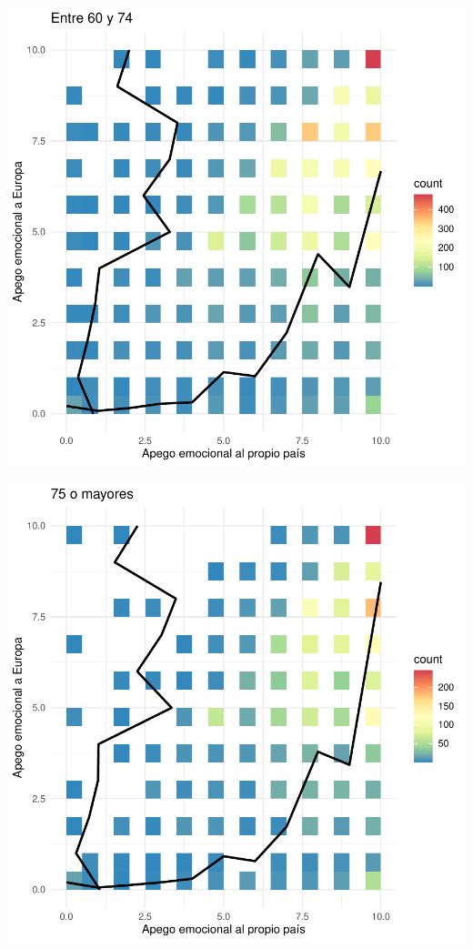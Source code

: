 \documentclass{article}
\begin{document}
\includegraphics{Informe-010}

\includegraphics{Informe-011}

\newpage
\end{document}

